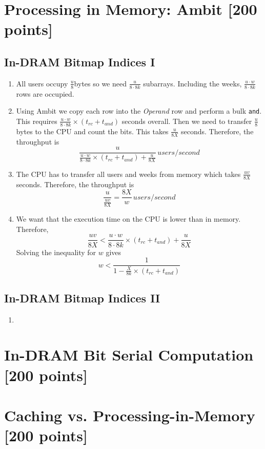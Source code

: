 \documentclass[a4paper]{article}
\begin{document}
\section{Processing in Memory: Ambit [200 points]}

\subsection{In-DRAM Bitmap Indices I}

\begin{enumerate}[label=\alph*)]
    \item All users occupy $\frac{u}{8}$bytes so we need $\frac{u}{8\cdot8k}$ subarrays. Including the
        weeks, $\frac{u \cdot w}{8\cdot8k}$ rows are occupied.
    \item Using Ambit we copy each row into the \textit{Operand} row and perform a bulk \verb|and|. This 
        requires $\frac{u \cdot w}{8\cdot8k} \times (t_{rc} + t_{and})$ seconds overall. Then we need 
        to transfer $\frac{u}{8}$bytes to the CPU and count the bits. This takes $\frac{u}{8X}$ seconds.
        Therefore, the throughput is
        \begin{equation*}
            \frac{u}{
                \frac{u \cdot w}{8\cdot8k} \times (t_{rc} + t_{and}) +
                \frac{u}{8X}
            } \, users/second
        \end{equation*}

    \item The CPU has to transfer all users and weeks from memory which takes $\frac{uv}{8X}$
        seconds. Therefore, the throughput is
        \begin{equation*}
            \frac{u}{\frac{uv}{8X}} = \frac{8X}{w} \, users/second
        \end{equation*}

    \item We want that the execution time on the CPU is lower than in memory. Therefore,
        \begin{equation*}
        \frac{uv}{8X} < \frac{u \cdot w}{8\cdot8k} \times (t_{rc} + t_{and}) +
                \frac{u}{8X}
        \end{equation*}
        Solving the inequality for $w$ gives
        \begin{equation*}
            w < \frac{1}{1 - \frac{X}{8k} \times (t_{rc} + t_{and})}
        \end{equation*}
\end{enumerate}

\subsection{In-DRAM Bitmap Indices II}

\begin{enumerate}[label=\alph*)]
    \item
\end{enumerate}

\section{In-DRAM Bit Serial Computation [200 points]}

\section{Caching vs. Processing-in-Memory [200 points]}
\end{document}
